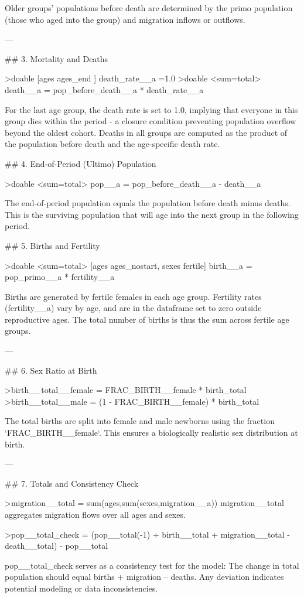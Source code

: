 \documentclass{article}
\begin{document}
{Older groups’ populations before death are determined by the primo population (those who aged into the group) and migration inflows or outflows.

---

## 3. Mortality and Deaths

>doable  [ages ages_end ]  death_rate__a =1.0  
>doable  <sum=total> death__a = pop_before_death__a  * death_rate__a

For the last age group, the death rate is set to 1.0, implying that everyone in this group dies within the period - 
a closure condition preventing population overflow beyond the oldest cohort.
Deaths in all groups are computed as the product of the population before death and the age-specific death rate.

## 4. End-of-Period (Ultimo) Population

>doable  <sum=total> pop__a  = pop_before_death__a  - death__a

The end-of-period population equals the population before death minus deaths.
This is the surviving population that will age into the next group in the following period.


## 5. Births and Fertility

>doable <sum=total> [ages ages_nostart,  sexes fertile] birth__a = pop_primo__a * fertility__a

Births are generated by fertile females in each age group.
Fertility rates (fertility__a) vary by age, and are in the dataframe set to zero outside reproductive ages.
The total number of births is thus the sum across fertile age groups.

---

## 6. Sex Ratio at Birth

>birth__total__female = FRAC_BIRTH__female * birth_total  
>birth__total__male = (1 - FRAC_BIRTH__female) * birth_total

The total births are split into female and male newborns using the fraction `FRAC_BIRTH__female`.
This ensures a biologically realistic sex distribution at birth.

---

## 7. Totals and Consistency Check

>migration__total = sum(ages,sum(sexes,migration__a))  
migration__total aggregates migration flows over all ages and sexes.

>pop__total_check  = (pop__total(-1) + birth__total + migration__total - death__total) - pop__total

pop__total_check serves as a consistency test for the model:
The change in total population should equal births + migration – deaths.
Any deviation indicates potential modeling or data inconsistencies.

}
\end{document}
